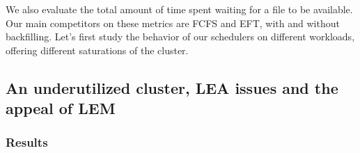 \documentclass[conference,10pt]{IEEEtran}
\newcommand{\file}{\ensuremath{\mathit{File}}\xspace}
\newcommand{\size}{\ensuremath{\mathit{Size}}\xspace}
\newcommand{\duration}{\mathit{Duration}\xspace}
\newcommand{\bandwidth}{\mathit{Bandwidth}\xspace}
\newcommand{\submissiontime}{\mathit{SubTime}\xspace}
\newcommand{\emptyflow}{\mathit{ReferenceFlow}\xspace}
\newcommand{\completiontime}{\mathit{CompletionTime}\xspace}
\begin{document}





We also evaluate the total amount of time spent waiting for a file to be available.
Our main competitors on these metrics are FCFS and EFT, with and without backfilling.
Let's first study the behavior of our schedulers on different workloads,
offering different saturations of the cluster.

\subsection{An underutilized cluster, LEA issues and the appeal of LEM}\label{sec.07-16}

\subsubsection{Results}
\end{document}
